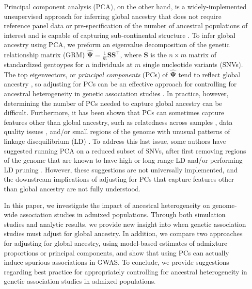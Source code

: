 \documentclass[12pt]{article}
\begin{document}
Principal component analysis (PCA), on the other hand, is a widely-implemented unsupervised approach for inferring global ancestry that does not require reference panel data or pre-specification of the number of ancestral populations of interest and is capable of capturing sub-continental structure \citep{novembre2008}. 
To infer global ancestry using PCA, we preform an eigenvalue decomposition of the genetic relationship matrix (GRM) $\hat{\boldsymbol\Psi} = \frac{1}{m} \mathbf{S} \mathbf{S}^\top$, where $\mathbf{S}$ is the $n \times m$ matrix of standardized gentoypes for $n$ individuals at $m$ single nucleotide variants (SNVs).
The top eigenvectors, or \textit{principal components} (PCs) of $\hat{\boldsymbol\Psi}$ tend to reflect global ancestry \citep{patterson2006, mcvean2009}, so adjusting for PCs can be an effective approach for controlling for ancestral heterogeneity in genetic association studies \citep{eigenstrat}. 
In practice, however, determining the number of PCs needed to capture global ancestry can be difficult. 
Furthermore, it has been shown that PCs can sometimes capture features other than global ancestry, such as relatedness across samples \citep{patterson2006, conomos2015}, data quality issues \citep{eigenstrat, weale2010}, and/or small regions of the genome with unusual patterns of linkage disequilibrium (LD) \citep{tian2008, price2008}. 
To address this last issue, some authors have suggested running PCA on a reduced subset of SNVs, after first removing regions of the genome that are known to have high or long-range LD \citep{price2008} and/or performing LD pruning \citep{anderson2010, abdellaoui2013}. 
However, these suggestions are not universally implemented, and the downstream implications of adjusting for PCs that capture features other than global ancestry are not fully understood.

In this paper, we investigate the impact of ancestral heterogeneity on genome-wide association studies in admixed populations.
Through both simulation studies and analytic results, we provide new insight into when genetic association studies must adjust for global ancestry.
In addition, we compare two approaches for adjusting for global ancestry, using model-based estimates of admixture proportions or principal components, and show that using PCs can actually induce spurious associations in GWAS.
To conclude, we provide suggestions regarding best practice for appropriately controlling for ancestral heterogeneity in genetic association studies in admixed populations.
\end{document}
